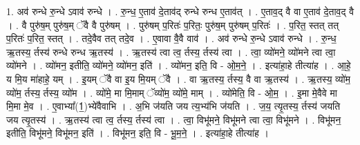 \documentclass[17pt]{extarticle}
\begin{document}
1. अव॑ रुन्धे रु॒न्धे ऽवाव॑ रुन्धे । . रु॒न्ध॒ ए॒ताव॑ दे॒ताव॑द् रुन्धे रुन्ध ए॒ताव॑त् । . ए॒ताव॒द् वै वा ए॒ताव॑ दे॒ताव॒द् वै । . वै पुरु॑ष॒म् पुरु॑ष॒म् ॅवै वै पुरु॑षम् । . पुरु॑षम् प॒रितः॑ प॒रितः॒ पुरु॑ष॒म् पुरु॑षम् प॒रितः॑ । . प॒रित॒ स्तत् तत् प॒रितः॑ प॒रित॒ स्तत् । . तदे॒वैव तत् तदे॒व । . ए॒वावा वै॒वै वाव॑ । . अव॑ रुन्धे रु॒न्धे ऽवाव॑ रुन्धे । . रु॒न्ध॒ ऋ॒तस्य॒ र्तस्य॑ रुन्धे रुन्ध ऋ॒तस्य॑ । . ऋ॒तस्य॑ त्वा त्व॒ र्तस्य॒ र्तस्य॑ त्वा । . त्वा॒ व्यो॑मने॒ व्यो॑मने त्वा त्वा॒ व्यो॑मने । . व्यो॑मन॒ इतीति॒ व्यो॑मने॒ व्यो॑मन॒ इति॑ । . व्यो॑मन॒ इति॒ वि - ओ॒म॒ने॒ । . इत्या॑हा॒हे तीत्या॑ह । . आ॒हे॒ य मि॒य मा॑हाहे॒ यम् । . इ॒यम् ॅवै वा इ॒य मि॒यम् ॅवै । . वा ऋ॒तस्य॒ र्तस्य॒ वै वा ऋ॒तस्य॑ । . ऋ॒तस्य॒ व्यो॑म॒ व्यो॑म॒ र्तस्य॒ र्तस्य॒ व्यो॑म । . व्यो॑मे॒ मा मि॒माम् ॅव्यो॑म॒ व्यो॑मे॒ माम् । . व्यो॑मेति॒ वि - ओ॒म॒ । . इ॒मा मे॒वैवे मा मि॒मा मे॒व । . ए॒वाभ्या᳚(1॒)भ्ये॑वैवाभि । . अ॒भि ज॑यति जय त्य॒भ्य॑भि ज॑यति । . ज॒य॒ त्यृ॒तस्य॒ र्तस्य॑ जयति जय त्यृ॒तस्य॑ । . ऋ॒तस्य॑ त्वा त्व॒ र्तस्य॒ र्तस्य॑ त्वा । . त्वा॒ विभू॑मने॒ विभू॑मने त्वा त्वा॒ विभू॑मने । . विभू॑मन॒ इतीति॒ विभू॑मने॒ विभू॑मन॒ इति॑ । . विभू॑मन॒ इति॒ वि - भू॒म॒ने॒ । . इत्या॑हा॒हे तीत्या॑ह । \newline
\end{document}
